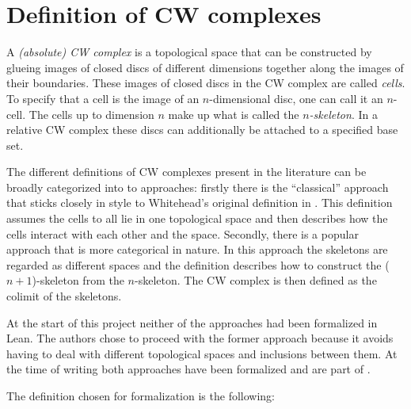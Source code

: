 \section{Definition of CW complexes}


A \emph{(absolute) CW complex} is a topological space that can be constructed by glueing images of closed discs of different dimensions together along the images of their boundaries. 
These images of closed discs in the CW complex are called \emph{cells}.
To specify that a cell is the image of an $n$-dimensional disc, one can call it an $n$-cell.
The cells up to dimension $n$ make up what is called the \emph{$n$-skeleton}.
In a relative CW complex these discs can additionally be attached to a specified base set. 

The different definitions of CW complexes present in the literature can be broadly categorized into to approaches: firstly there is the ``classical'' approach that sticks closely in style to Whitehead's original definition in \cite{Whitehead2018}.
This definition assumes the cells to all lie in one topological space and then describes how the cells interact with each other and the space.
Secondly, there is a popular approach that is more categorical in nature. 
In this approach the skeletons are regarded as different spaces and the definition describes how to construct the ($n+1$)-skeleton from the $n$-skeleton. 
The CW complex is then defined as the colimit of the skeletons. 

At the start of this project neither of the approaches had been formalized in Lean. 
The authors chose to proceed with the former approach because it avoids having to deal with different topological spaces and inclusions between them. 
At the time of writing both approaches have been formalized and are part of \mathlib. 

The definition chosen for formalization is the following: 

